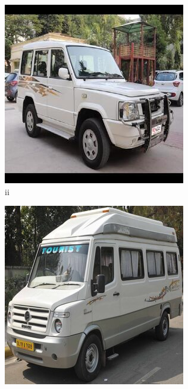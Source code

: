 \begin{enumerate}
\begin{figure}[H]
\begin{subfigure}[b]{0.2\textwidth}
               \includegraphics[width=\textwidth]{images/dataset_images/idd_samples/Tata_sumo.jpg}\hfill
               \caption{ii}
               \label{sumo}
            \end{subfigure}
            \begin{subfigure}[b]{0.2\textwidth}
               \includegraphics[width=\textwidth]{images/dataset_images/idd_samples/Tempo-Traveller.jpg}

\end{subfigure}
\end{figure}
\end{enumerate}
